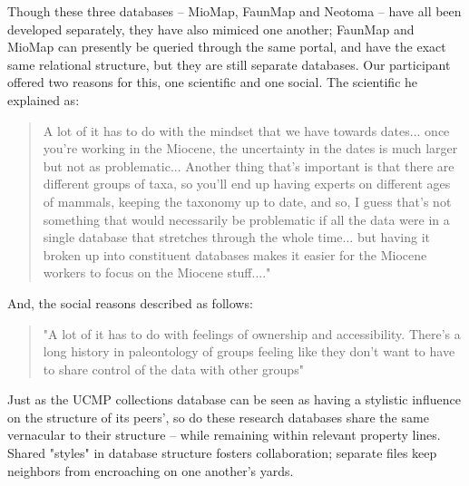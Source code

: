 Though these three databases -- MioMap, FaunMap and Neotoma -- have all been developed separately, they have also mimiced one another;  FaunMap and MioMap can presently be queried through the same portal, and have the exact same relational structure, but they are still separate databases.  Our participant offered two reasons for this, one scientific and one social. The scientific he explained as:
\begin{quote}
A lot of it has to do with the mindset that we have towards dates... once you're working in the Miocene, the uncertainty in the dates is much larger but not as problematic... Another thing that's important is that there are different groups of taxa, so you'll end up having experts on different ages of mammals, keeping the taxonomy up to date, and so, I guess that's not something that would necessarily be problematic if all the data were in a single database that stretches through the whole time... but having it broken up into constituent databases makes it easier for the Miocene workers to focus on the Miocene stuff...."
\end{quote}
And, the social reasons described as follows:
\begin{quote}
"A lot of it has to do with feelings of ownership and accessibility. There's a long history in paleontology of groups feeling like they don't want to have to share control of the data with other groups"
\end{quote}
Just as the UCMP collections database can be seen as having a stylistic influence on the structure of its peers', so do these research databases share the same vernacular to their structure -- while remaining within relevant property lines. Shared "styles" in database structure fosters collaboration; separate files keep neighbors from encroaching on one another's yards.

